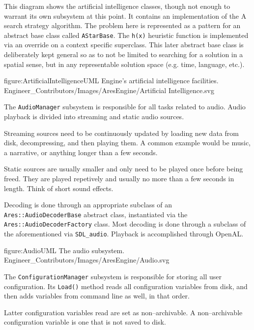 This diagram shows the artificial intelligence classes, though not enough to warrant its own subsystem at this point. It contains an implementation of the A\high{*} search strategy algorithm. The problem here is represented as a pattern for an abstract base class called {\tt AStarBase}. The {\tt h(x)} heuristic function is implemented via an override on a context specific superclass. This later abstract base class is deliberately kept general so as to not be limited to searching for a solution in a spatial sense, but in any representable solution space (e.g. time, language, etc.).

\FullPageDiagram
    {figure:ArtificialIntelligenceUML}
    {Engine's artificial intelligence facilities.}
    {Engineer_Contributors/Images/AresEngine/Artificial Intelligence.svg}

\page
{}
The {\tt AudioManager} subsystem is responsible for all tasks related to audio. Audio playback is divided into streaming and static audio sources. 

Streaming sources need to be continuously updated by loading new data from disk, decompressing, and then playing them. A common example would be music, a narrative, or anything longer than a few seconds.

Static sources are usually smaller and only need to be played once before being freed. They are played repetively and usually no more than a few seconds in length. Think of short sound effects.

Decoding is done through an appropriate subclass of an {\tt Ares::AudioDecoderBase} abstract class, instantiated via the {\tt Ares::AudioDecoderFactory} class. Most decoding is done through a subclass of the aforementioned via {\tt SDL_audio}. Playback is accomplished through OpenAL.

\FullPageDiagram
    {figure:AudioUML}
    {The audio subsystem.}
    {Engineer_Contributors/Images/AresEngine/Audio.svg}

\page
{}
The {\tt ConfigurationManager} subsystem is responsible for storing all user configuration. Its {\tt Load()} method reads all configuration variables from disk, and then adds variables from command line as well, in that order. 

Latter configuration variables read are set as non--archivable. A non--archivable configuration variable is one that is not saved to disk.

